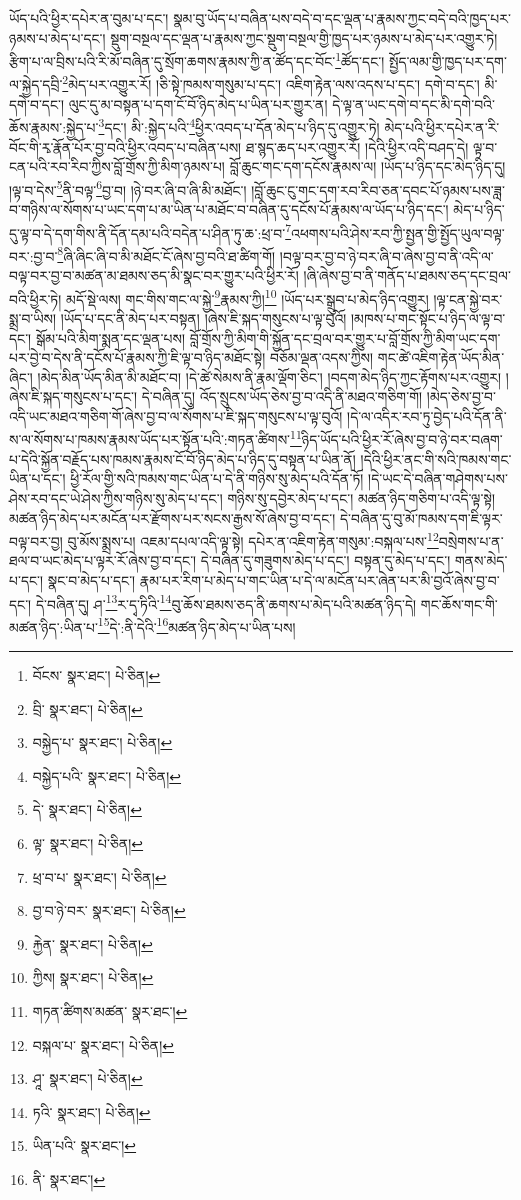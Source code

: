 ཡོད་པའི་ཕྱིར་དཔེར་ན་བུམ་པ་དང་། སྣམ་བུ་ཡོད་པ་བཞིན་པས་བདེ་བ་དང་ལྡན་པ་རྣམས་ཀྱང་བདེ་བའི་ཁྱད་པར་ཉམས་པ་མེད་པ་དང་། སྡུག་བསྔལ་དང་ལྡན་པ་རྣམས་ཀྱང་སྡུག་བསྔལ་གྱི་ཁྱད་པར་ཉམས་པ་མེད་པར་འགྱུར་ཏེ། རྩིག་པ་ལ་བྲིས་པའི་རི་མོ་བཞིན་དུ་སྲོག་ཆགས་རྣམས་ཀྱི་ན་ཚོད་དང་བོང་\footnote{བོངས་  སྣར་ཐང་།  པེ་ཅིན། }ཚོད་དང་། སྤྱོད་ལམ་གྱི་ཁྱད་པར་དག་ལ་སྐྱེད་དབྲི་\footnote{བྲི་  སྣར་ཐང་།  པེ་ཅིན། }མེད་པར་འགྱུར་རོ། །ཅི་སྟེ་ཁམས་གསུམ་པ་དང་། འཇིག་རྟེན་ལས་འདས་པ་དང་། དགེ་བ་དང་། མི་དགེ་བ་དང་། ལུང་དུ་མ་བསྟན་པ་དག་ངོ་བོ་ཉིད་མེད་པ་ཡིན་པར་གྱུར་ན། དེ་ལྟ་ན་ཡང་དགེ་བ་དང་མི་དགེ་བའི་ཆོས་རྣམས་:སྐྱེད་པ་\footnote{བསྐྱེད་པ་  སྣར་ཐང་།  པེ་ཅིན། }དང་། མི་:སྐྱེད་པའི་\footnote{བསྐྱེད་པའི་  སྣར་ཐང་།  པེ་ཅིན། }ཕྱིར་འབད་པ་དོན་མེད་པ་ཉིད་དུ་འགྱུར་ཏེ། མེད་པའི་ཕྱིར་དཔེར་ན་རི་བོང་གི་རྭ་རྣོན་པོར་བྱ་བའི་ཕྱིར་འབད་པ་བཞིན་པས། ཐ་སྙད་ཆད་པར་འགྱུར་རོ། །དེའི་ཕྱིར་འདི་བཤད་དེ། ལྟ་བ་ངན་པའི་རབ་རིབ་ཀྱིས་བློ་གྲོས་ཀྱི་མིག་ཉམས་པ། བློ་ཆུང་གང་དག་དངོས་རྣམས་ལ། །ཡོད་པ་ཉིད་དང་མེད་ཉིད་དུ། །ལྟ་བ་དེས་\footnote{དེ་  སྣར་ཐང་།  པེ་ཅིན། }ནི་བལྟ་\footnote{ལྟ་  སྣར་ཐང་།  པེ་ཅིན། }བྱ་བ། །ཉེ་བར་ཞི་བ་ཞི་མི་མཐོང་། །བློ་ཆུང་ངུ་གང་དག་རབ་རིབ་ཅན་དབང་པོ་ཉམས་པས་ཟླ་བ་གཉིས་ལ་སོགས་པ་ཡང་དག་པ་མ་ཡིན་པ་མཐོང་བ་བཞིན་དུ་དངོས་པོ་རྣམས་ལ་ཡོད་པ་ཉིད་དང་། མེད་པ་ཉིད་དུ་ལྟ་བ་དེ་དག་གིས་ནི་དོན་དམ་པའི་བདེན་པ་ཤིན་ཏུ་ཆ་:ཕྲ་བ་\footnote{ཕྲ་བ་པ་  སྣར་ཐང་།  པེ་ཅིན། }འཕགས་པའི་ཤེས་རབ་ཀྱི་སྤྱན་གྱི་སྤྱོད་ཡུལ་བལྟ་བར་:བྱ་བ་\footnote{བྱ་བ་ཉེ་བར་  སྣར་ཐང་།  པེ་ཅིན། }ཞི་ཞིང་ཞི་བ་མི་མཐོང་ངོ་ཞེས་བྱ་བའི་ཐ་ཚིག་གོ། །བལྟ་བར་བྱ་བ་ཉེ་བར་ཞི་བ་ཞེས་བྱ་བ་ནི་འདི་ལ་བལྟ་བར་བྱ་བ་མཚན་མ་ཐམས་ཅད་མི་སྣང་བར་གྱུར་པའི་ཕྱིར་རོ། །ཞི་ཞེས་བྱ་བ་ནི་གནོད་པ་ཐམས་ཅད་དང་བྲལ་བའི་ཕྱིར་ཏེ། མདོ་སྡེ་ལས། གང་གིས་གང་ལ་སྐྱེ་\footnote{རྐྱེན་  སྣར་ཐང་།  པེ་ཅིན། }རྣམས་ཀྱི།\footnote{ཀྱིས།  སྣར་ཐང་།  པེ་ཅིན། } །ཡོད་པར་སྒྲུབ་པ་མེད་ཉིད་འགྱུར། །ལྟ་ངན་སྐྱེ་བར་སྨྲ་བ་ཡིས། །ཡོད་པ་དང་ནི་མེད་པར་བསྟན། །ཞེས་ཇི་སྐད་གསུངས་པ་ལྟ་བུའོ། །མཁས་པ་གང་སྟོང་པ་ཉིད་ལ་ལྟ་བ་དང་། སྒོམ་པའི་མིག་སྨན་དང་ལྡན་པས། བློ་གྲོས་ཀྱི་མིག་གི་སྐྱོན་དང་བྲལ་བར་གྱུར་པ་བློ་གྲོས་ཀྱི་མིག་ཡང་དག་པར་བྱེ་བ་དེས་ནི་དངོས་པོ་རྣམས་ཀྱི་ཇི་ལྟ་བ་ཉིད་མཐོང་སྟེ། བཅོམ་ལྡན་འདས་ཀྱིས། གང་ཚེ་འཇིག་རྟེན་ཡོད་མིན་ཞིང་། །མེད་མིན་ཡོད་མིན་མི་མཐོང་བ། །དེ་ཚེ་སེམས་ནི་རྣམ་ལྡོག་ཅིང་། །བདག་མེད་ཉིད་ཀྱང་རྟོགས་པར་འགྱུར། །ཞེས་ཇི་སྐད་གསུངས་པ་དང་། དེ་བཞིན་དུ། འོད་སྲུངས་ཡོད་ཅེས་བྱ་བ་འདི་ནི་མཐའ་གཅིག་གོ། །མེད་ཅེས་བྱ་བ་འདི་ཡང་མཐའ་གཅིག་གོ་ཞེས་བྱ་བ་ལ་སོགས་པ་ཇི་སྐད་གསུངས་པ་ལྟ་བུའོ། །དེ་ལ་འདིར་རབ་ཏུ་བྱེད་པའི་དོན་ནི་ས་ལ་སོགས་པ་ཁམས་རྣམས་ཡོད་པར་སྟོན་པའི་:གཏན་ཚིགས་\footnote{གཏན་ཚིགས་མཚན་  སྣར་ཐང་། }ཉིད་ཡོད་པའི་ཕྱིར་རོ་ཞེས་བྱ་བ་ཉེ་བར་བཞག་པ་དེའི་སྐྱོན་བརྗོད་པས་ཁམས་རྣམས་ངོ་བོ་ཉིད་མེད་པ་ཉིད་དུ་བསྟན་པ་ཡིན་ནོ། །དེའི་ཕྱིར་ནང་གི་སའི་ཁམས་གང་ཡིན་པ་དང་། ཕྱི་རོལ་གྱི་སའི་ཁམས་གང་ཡིན་པ་དེ་ནི་གཉིས་སུ་མེད་པའི་དོན་ཏོ། །དེ་ཡང་དེ་བཞིན་གཤེགས་པས་ཤེས་རབ་དང་ཡེ་ཤེས་ཀྱིས་གཉིས་སུ་མེད་པ་དང་། གཉིས་སུ་དབྱེར་མེད་པ་དང་། མཚན་ཉིད་གཅིག་པ་འདི་ལྟ་སྟེ། མཚན་ཉིད་མེད་པར་མངོན་པར་རྫོགས་པར་སངས་རྒྱས་སོ་ཞེས་བྱ་བ་དང་། དེ་བཞིན་དུ་བུ་མོ་ཁམས་དག་ཇི་ལྟར་བལྟ་བར་བྱ། བུ་མོས་སྨྲས་པ། འཇམ་དཔལ་འདི་ལྟ་སྟེ། དཔེར་ན་འཇིག་རྟེན་གསུམ་:བསྐལ་པས་\footnote{བསྐལ་པ་  སྣར་ཐང་།  པེ་ཅིན། }བསྲེགས་པ་ན་ཐལ་བ་ཡང་མེད་པ་ལྟར་རོ་ཞེས་བྱ་བ་དང་། དེ་བཞིན་དུ་གཟུགས་མེད་པ་དང་། བསྟན་དུ་མེད་པ་དང་། གནས་མེད་པ་དང་། སྣང་བ་མེད་པ་དང་། རྣམ་པར་རིག་པ་མེད་པ་གང་ཡིན་པ་དེ་ལ་མངོན་པར་ཞེན་པར་མི་བྱའོ་ཞེས་བྱ་བ་དང་། དེ་བཞིན་དུ། ཤ་\footnote{ཤཱ་  སྣར་ཐང་།  པེ་ཅིན། }ར་དྭ་ཏིའི་\footnote{ཏའི་  སྣར་ཐང་།  པེ་ཅིན། }བུ་ཆོས་ཐམས་ཅད་ནི་ཆགས་པ་མེད་པའི་མཚན་ཉིད་དེ། གང་ཆོས་གང་གི་མཚན་ཉིད་:ཡིན་པ་\footnote{ཡིན་པའི་  སྣར་ཐང་། }དེ་:ནི་དེའི་\footnote{ནི་  སྣར་ཐང་། }མཚན་ཉིད་མེད་པ་ཡིན་པས། 